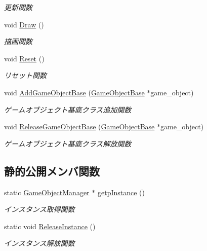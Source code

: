 \begin{DoxyCompactItemize}
\begin{DoxyCompactList}\small\item\em 更新関数 \end{DoxyCompactList}\item 
void \mbox{\hyperlink{class_game_object_manager_a0549bd4b6575ee28803c0ff8fd2be2ee}{Draw}} ()
\begin{DoxyCompactList}\small\item\em 描画関数 \end{DoxyCompactList}\item 
void \mbox{\hyperlink{class_game_object_manager_a77f770050f7d8022bfeceda098846ae8}{Reset}} ()
\begin{DoxyCompactList}\small\item\em リセット関数 \end{DoxyCompactList}\item 
void \mbox{\hyperlink{class_game_object_manager_a30e496fe43d48b434da34ade418b4fdb}{Add\+Game\+Object\+Base}} (\mbox{\hyperlink{class_game_object_base}{Game\+Object\+Base}} $\ast$game\+\_\+object)
\begin{DoxyCompactList}\small\item\em ゲームオブジェクト基底クラス追加関数 \end{DoxyCompactList}\item 
void \mbox{\hyperlink{class_game_object_manager_a0293d3dca4c52d908da0906d982b44cc}{Release\+Game\+Object\+Base}} (\mbox{\hyperlink{class_game_object_base}{Game\+Object\+Base}} $\ast$game\+\_\+object)
\begin{DoxyCompactList}\small\item\em ゲームオブジェクト基底クラス解放関数 \end{DoxyCompactList}\end{DoxyCompactItemize}
\subsection*{静的公開メンバ関数}
\begin{DoxyCompactItemize}
\item 
static \mbox{\hyperlink{class_game_object_manager}{Game\+Object\+Manager}} $\ast$ \mbox{\hyperlink{class_game_object_manager_abd04286fb8e2ac72a5f0468263f9553d}{getp\+Instance}} ()
\begin{DoxyCompactList}\small\item\em インスタンス取得関数 \end{DoxyCompactList}\item 
static void \mbox{\hyperlink{class_game_object_manager_a01636a5f8fb099ab0633fad06755be0e}{Release\+Instance}} ()
\begin{DoxyCompactList}\small\item\em インスタンス解放関数 \end{DoxyCompactList}\end{DoxyCompactItemize}
